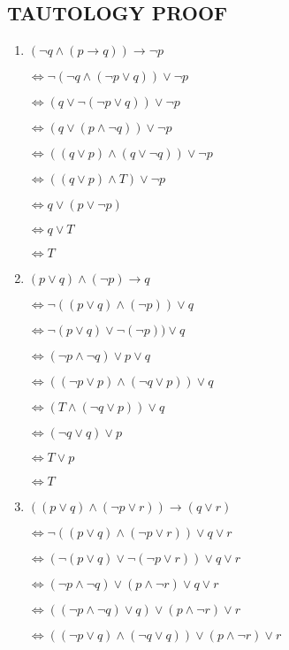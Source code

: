 \documentclass{../../cls/sig-alternate-05-2015}
\begin{document}
\subsection{TAUTOLOGY PROOF}
\begin{enumerate}
\item $(\neg q \land (p \rightarrow q))\rightarrow \neg p$

$\Leftrightarrow  \neg (\neg q \land (\neg p \lor q))\lor \neg p$

$\Leftrightarrow   ( q \lor \neg(\neg p \lor q))\lor \neg p$

$\Leftrightarrow   ( q \lor  (p \land \neg q))\lor \neg p$

$\Leftrightarrow   (( q \lor p) \land (q\lor \neg q))\lor \neg p$

$\Leftrightarrow   (( q \lor p) \land T)\lor \neg p$

$\Leftrightarrow    q \lor (p\lor \neg p)$

$\Leftrightarrow    q \lor T$

$\Leftrightarrow     T$
\item $ (p\lor q)\land (\neg p) \rightarrow q$

$\Leftrightarrow \neg ((p\lor q)\land (\neg p)) \lor q$

$\Leftrightarrow \neg(p\lor q)\lor \neg (\neg p)) \lor q$

$\Leftrightarrow (\neg p\land \neg q )\lor p \lor q$

$\Leftrightarrow ((\neg p \lor p )\land (\neg q \lor p)) \lor q$

$\Leftrightarrow (T\land (\neg q \lor p)) \lor q$

$\Leftrightarrow (\neg q \lor q) \lor p$

$\Leftrightarrow T \lor p$

$\Leftrightarrow T$
\item $ ((p \lor q) \land (\neg p \lor r)) \rightarrow (q\lor r)$

$\Leftrightarrow \neg  ((p \lor q) \land (\neg p \lor r)) \lor q\lor r$

$\Leftrightarrow   (\neg(p \lor q) \lor \neg (\neg p \lor r)) \lor q \lor r$

$\Leftrightarrow   (\neg p \land \neg q) \lor (p \land \neg r) \lor q\lor r$

$\Leftrightarrow   ((\neg p \land \neg q)\lor q) \lor (p \land \neg r) \lor r$

$\Leftrightarrow   ((\neg p\lor q) \land (\neg q\lor q) )\lor ( p \land \neg r) \lor r$


\end{enumerate}
\end{document}
